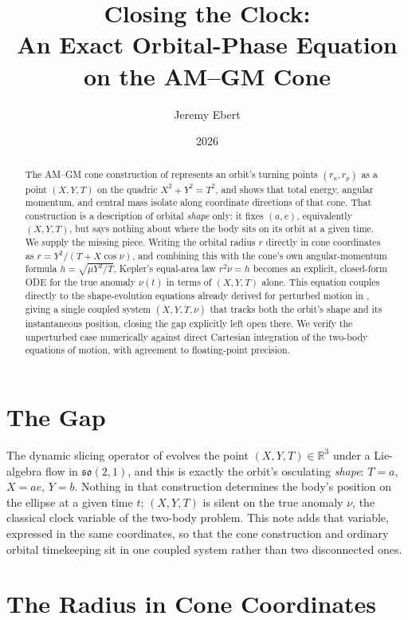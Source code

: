 \documentclass[12pt]{amsart}
\title[The Orbital Phase Equation on the AM--GM Cone]{Closing the Clock:\\
An Exact Orbital-Phase Equation on the AM--GM Cone}
\author{Jeremy Ebert}
\date{2026}
\theoremstyle{plain}
\theoremstyle{remark}
\begin{document}
\maketitle

\begin{abstract}
The AM--GM cone construction of \cite{Ebert2026Cone} represents an orbit's turning points $(r_a,r_p)$ as a point $(X,Y,T)$ on the quadric $X^2+Y^2=T^2$, and shows that total energy, angular momentum, and central mass isolate along coordinate directions of that cone. That construction is a description of orbital \emph{shape} only: it fixes $(a,e)$, equivalently $(X,Y,T)$, but says nothing about where the body sits on its orbit at a given time. We supply the missing piece. Writing the orbital radius $r$ directly in cone coordinates as $r=Y^2/(T+X\cos\nu)$, and combining this with the cone's own angular-momentum formula $h=\sqrt{\mu Y^2/T}$, Kepler's equal-area law $r^2\dot\nu=h$ becomes an explicit, closed-form ODE for the true anomaly $\nu(t)$ in terms of $(X,Y,T)$ alone. This equation couples directly to the shape-evolution equations already derived for perturbed motion in \cite{Ebert2026Cone}, giving a single coupled system $(\dot X,\dot Y,\dot T,\dot\nu)$ that tracks both the orbit's shape and its instantaneous position, closing the gap explicitly left open there. We verify the unperturbed case numerically against direct Cartesian integration of the two-body equations of motion, with agreement to floating-point precision.
\end{abstract}

\section{The Gap}

The dynamic slicing operator of \cite{Ebert2026Cone} evolves the point $(X,Y,T)\in\mathbb{R}^3$ under a Lie-algebra flow in $\mathfrak{so}(2,1)$, and this is exactly the orbit's osculating \emph{shape}: $T=a$, $X=ae$, $Y=b$. Nothing in that construction determines the body's position on the ellipse at a given time $t$; $(X,Y,T)$ is silent on the true anomaly $\nu$, the classical clock variable of the two-body problem. This note adds that variable, expressed in the same coordinates, so that the cone construction and ordinary orbital timekeeping sit in one coupled system rather than two disconnected ones.

\section{The Radius in Cone Coordinates}
\end{document}
